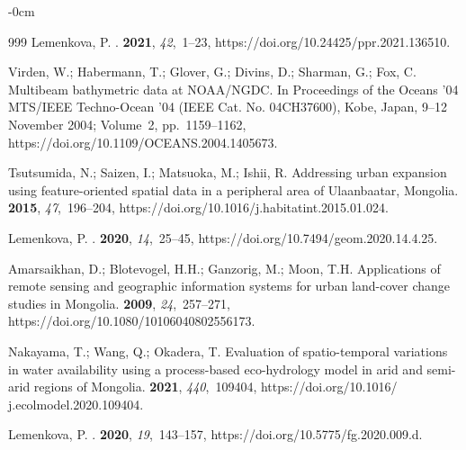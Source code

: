 \documentclass[geosciences,article,accept,pdftex,oneauthor]{Definitions/mdpi}
\begin{document}
\begin{adjustwidth}{-\extralength}{0cm}
\begin{thebibliography}{999}
Lemenkova, P.
.
 {\bf 2021}, {\em 42},~1--23, https://doi.org/10.24425/ppr.2021.136510.

Virden, W.; Habermann, T.; Glover, G.; Divins, D.; Sharman, G.; Fox, C.
\newblock Multibeam bathymetric data at NOAA/NGDC.
\newblock In Proceedings of the Oceans '04 MTS/IEEE Techno-Ocean '04 (IEEE Cat.
  No. 04CH37600), Kobe, Japan, 9--12 November 2004; Volume~2, pp.~1159--1162, https://doi.org/10.1109/OCEANS.2004.1405673.

Tsutsumida, N.; Saizen, I.; Matsuoka, M.; Ishii, R.
\newblock Addressing urban expansion using feature-oriented spatial data in
  a peripheral area of Ulaanbaatar, Mongolia.
 {\bf 2015}, {\em 47},~196--204, https://doi.org/10.1016/j.habitatint.2015.01.024.

Lemenkova, P.
.
 {\bf 2020}, {\em
  14},~25--45, https://doi.org/10.7494/geom.2020.14.4.25.

Amarsaikhan, D.; Blotevogel, H.H.; Ganzorig, M.; Moon, T.H.
\newblock Applications of remote sensing and geographic information systems for
  urban land-cover change studies in Mongolia.
 {\bf 2009}, {\em 24},~257--271, https://doi.org/10.1080/10106040802556173.

Nakayama, T.; Wang, Q.; Okadera, T.
\newblock Evaluation of spatio-temporal variations in water availability using
  a process-based eco-hydrology model in arid and semi-arid regions of
  Mongolia.
 {\bf 2021}, {\em 440},~109404, https://doi.org/10.1016/ j.ecolmodel.2020.109404.

Lemenkova, P.
.
 {\bf 2020}, {\em 19},~143--157, https://doi.org/10.5775/fg.2020.009.d.


\end{thebibliography}
\end{adjustwidth}
\end{document}
